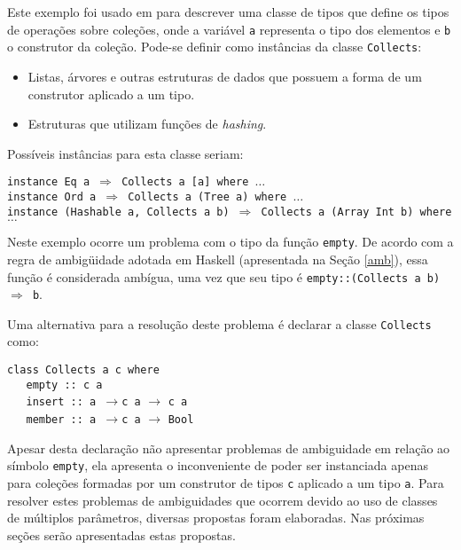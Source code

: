 Este exemplo foi usado em \cite{Jones00} para descrever uma classe de tipos que define os tipos de 
opera\c{c}\~oes sobre cole\c{c}\~oes, 
onde a vari\'avel \texttt{a} representa o tipo dos elementos e \texttt{b} o construtor da cole\c{c}\~ao. 
Pode-se definir como inst\^ancias da classe \texttt{Collects}:
\begin{itemize}
    \item{Listas, \'arvores e outras estruturas de dados que possuem a forma de um construtor
          aplicado a um tipo.}
    \item{Estruturas que utilizam fun\c{c}\~oes de \emph{hashing}.}
\end{itemize}

Poss\'iveis inst\^ancias para esta classe seriam:
\begin{flushleft}
    \texttt{instance Eq a $\Rightarrow$ Collects a [a] where $\ldots$}\\
    \texttt{instance Ord a $\Rightarrow$ Collects a (Tree a) where $\ldots$}\\
    \texttt{instance (Hashable a, Collects a b) $\Rightarrow$ Collects a (Array Int b) where
           $\ldots$}\\
\end{flushleft}

Neste exemplo ocorre um problema com o tipo da fun\c{c}\~ao \texttt{empty}. De acordo com a regra 
de ambig\"uidade adotada em Haskell (apresentada na Se\c{c}\~ao \ref{amb}), essa fun\c{c}\~ao \'e considerada 
amb\'igua, uma vez que seu tipo \'e \texttt{empty::(Collects a b) $\Rightarrow$ b}. 

Uma alternativa para a resolu\c{c}\~ao deste problema \'e declarar a classe \texttt{Collects} 
como:

\begin{flushleft}
   \verb|class Collects a c where|\\
   \verb|   empty :: c a|\\
   \verb|   insert :: a |$\rightarrow$\verb|c a| $\rightarrow$ \verb|c a|\\
   \verb|   member :: a |$\rightarrow$\verb|c a| $\rightarrow$ \verb|Bool|\\
\end{flushleft}

Apesar desta declara\c{c}\~ao n\~ao apresentar problemas de ambiguidade em rela\c{c}\~ao ao s\'imbolo 
\texttt{empty}, ela apresenta o inconveniente de poder ser instanciada apenas para 
cole\c{c}\~oes formadas por um construtor de tipos \texttt{c} aplicado a um tipo \texttt{a}. 
Para resolver estes problemas de ambiguidades que ocorrem devido ao uso de classes de m\'ultiplos 
par\^ametros, diversas propostas foram elaboradas. Nas pr\'oximas se\c{c}\~oes ser\~ao apresentadas estas propostas.

